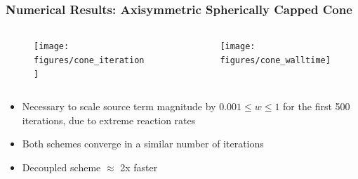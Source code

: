 \documentclass{beamer}
\begin{document}
\begin{frame}
  \frametitle{Numerical Results: Axisymmetric Spherically Capped Cone}
    \begin{columns}[t]
      \begin{column}{0.5\textwidth}
        \begin{figure}[h!]
    	  \texttt{[image: figures/cone\_iteration]}
        \end{figure}
      \end{column}
      \begin{column}{0.5\textwidth}
        \begin{figure}[h!]
	  \texttt{[image: figures/cone\_walltime]}
        \end{figure}
      \end{column}
    \end{columns}
  \begin{itemize}
    \item Necessary to scale source term magnitude by $0.001 \leq w \leq 1$ 
      for the first 500 iterations, due to extreme reaction rates
    \item Both schemes converge in a similar number of iterations
    \item Decoupled scheme $\approx$ 2x faster
  \end{itemize}
\end{frame}
\end{document}
